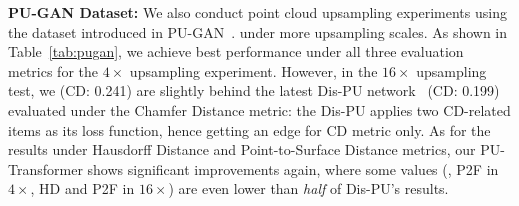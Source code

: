 \noindent \textbf{PU-GAN Dataset:}
We also conduct point cloud upsampling experiments using the dataset introduced in PU-GAN~\cite{li2019pu}. under more upsampling scales. As shown in Table~\ref{tab:pugan}, we achieve best performance under all three evaluation metrics for the $4\times$ upsampling experiment. However, in the $16\times$ upsampling test, we (CD: 0.241) are slightly behind the latest Dis-PU network~\cite{li2021point} (CD: 0.199) evaluated under the Chamfer Distance metric: the Dis-PU applies two CD-related items as its loss function, hence getting an edge for CD metric only. As for the results under Hausdorff Distance and Point-to-Surface Distance metrics, our PU-Transformer shows significant improvements again, where some values (\eg, P2F in $4\times$, HD and P2F in $16\times$) are even lower than \emph{half} of Dis-PU's results.

